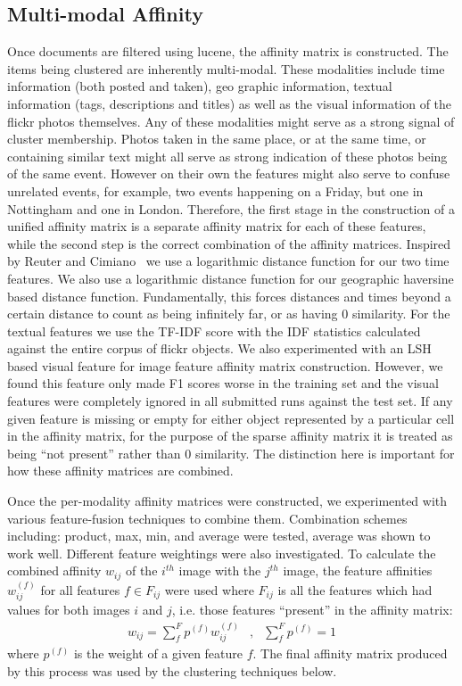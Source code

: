 \documentclass{../acm_proc_article-me11_tweaked}
\begin{document}
\subsection{Multi-modal Affinity} %
\label{ssub:multi_modal_affinity}
Once documents are filtered using lucene, the affinity matrix is constructed. The items being clustered are inherently multi-modal. These modalities include time information (both posted and taken), geo graphic information, textual information (tags, descriptions and titles) as well as the visual information of the flickr photos themselves. Any of these modalities might serve as a strong signal of cluster membership. Photos taken in the same place, or at the same time, or containing similar text might all serve as strong indication of these photos being of the same event. However on their own the features might also serve to confuse unrelated events, for example, two events happening on a Friday, but one in Nottingham and one in London. Therefore, the first stage in the construction of a unified affinity matrix is a separate affinity matrix for each of these features, while the second step is the correct combination of the affinity matrices. Inspired by Reuter and Cimiano~\cite{Reuter2012ECS23247962324824} we use a logarithmic distance function for our two time features. We also use a logarithmic distance function for our geographic haversine based distance function. Fundamentally, this forces distances and times beyond a certain distance to count as being infinitely far, or as having 0 similarity. For the textual features we use the TF-IDF score with the IDF statistics calculated against the entire corpus of flickr objects. We also experimented with an LSH based visual feature for image feature affinity matrix construction. However, we found this feature only made F1 scores worse in the training set and the visual features were completely ignored in all submitted runs against the test set. If any given feature is missing or empty for either object represented by a particular cell in the affinity matrix, for the purpose of the sparse affinity matrix it is treated as being ``not present'' rather than 0 similarity. The distinction here is important for how these affinity matrices are combined.

Once the per-modality affinity matrices were constructed, we experimented with various feature-fusion techniques to combine them. Combination schemes including: product, max, min, and average were tested, average was shown to work well. Different feature weightings were also investigated. To calculate the combined affinity $w_{ij}$ of the $i^{th}$ image with the $j^{th}$ image, the feature affinities $w_{ij}^{(f)}$ for all features $f\in F_{ij}$ were used where $F_{ij}$ is all the features which had values for both images $i$ and $j$, i.e. those features ``present'' in the affinity matrix:
\begin{eqnarray}
 w_{ij} = \sum\limits_{f}^F p^{(f)} w_{ij}^{(f)}&,&\sum\limits_{f}^F p^{(f)} = 1
\end{eqnarray}
where $p^{(f)}$ is the weight of a given feature $f$. The final affinity matrix produced by this process was used by the clustering techniques below.
\end{document}
